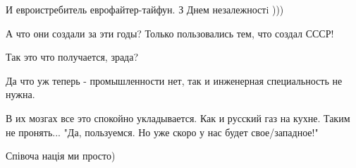 \begin{itemize}
 
И евроистребитель еврофайтер-тайфун. З Днем незалежностi )))

 
А что они создали за эти годы? Только пользовались тем, что создал СССР!

 
Так это что получается, зрада?

 
Да что уж теперь - промышленности нет, так и инженерная специальность не нужна.

 

В их мозгах все это спокойно укладывается. Как и русский газ на кухне. Таким не
пронять... "Да, пользуемся. Но уже скоро у нас будет свое/западное!"


 
Співоча нація ми просто)

 


\end{itemize}
